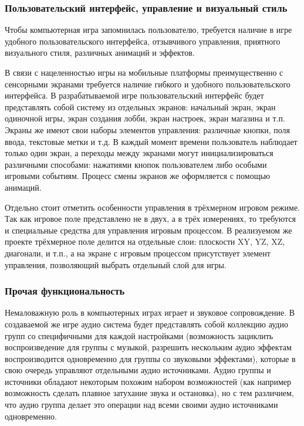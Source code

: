 \subsubsection{Пользовательский интерфейс, управление и визуальный стиль}

Чтобы компьютерная игра запомнилась пользователю, требуется наличие в игре удобного пользовательского интерфейса, отзывчивого управления, приятного визуального стиля, различных анимаций и эффектов.

В связи с нацеленностью игры на мобильные платформы преимущественно с сенсорными экранами требуется наличие гибкого и удобного пользовательского интерфейса. В разрабатываемой игре пользовательский интерфейс будет представлять собой систему из отдельных экранов: начальный экран, экран одиночной игры, экран создания лобби, экран настроек, экран магазина и т.п. Экраны же имеют свои наборы элементов управления: различные кнопки, поля ввода, текстовые метки и т.д. В каждый момент времени пользователь наблюдает только один экран, а переходы между экранами могут инициализироваться различными способами: нажатиями кнопок пользователем либо особыми игровыми событиям. Процесс смены экранов же оформляется с помощью анимаций.

Отдельно стоит отметить особенности управления в трёхмерном игровом режиме. Так как игровое поле представлено не в двух, а в трёх измерениях, то требуются и специальные средства для управления игровым процессом. В реализуемом же проекте трёхмерное поле делится на отдельные слои: плоскости XY, YZ, XZ, диагонали, и т.п., а на экране с игровым процессом присутствует элемент управления, позволяющий выбрать отдельный слой для игры.


\subsubsection{Прочая функциональность}

Немаловажную роль в компьютерных играх играет и звуковое сопровождение. В создаваемой же игре аудио система будет представлять собой коллекцию аудио групп со специфичными для каждой настройками (возможность зациклить воспроизведение для группы с музыкой, разрешить нескольким аудио эффектам воспроизводится одновременно для группы со звуковыми эффектами), которые в свою очередь управляют отдельными аудио источниками. Аудио группы и источники обладают некоторым похожим набором возможностей (как например возможность сделать плавное затухание звука и остановка), но с тем различием, что аудио группа делает это операции над всеми своими аудио источниками одновременно.

